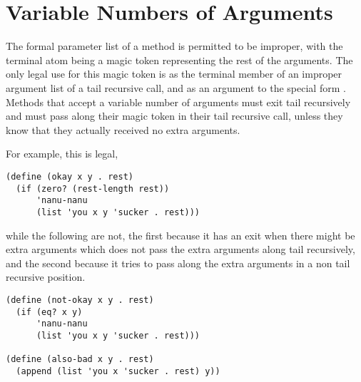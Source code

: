 



\section{Variable Numbers of Arguments} \label{sec:varargs}

The formal parameter list of a method is permitted to be improper,
with the terminal atom being a magic token representing the rest of
the arguments.  The only legal use for this magic token is as the
terminal member of an improper argument list of a tail recursive call,
and as an argument to the special form .  Methods that
accept a variable number of arguments must exit tail recursively and
must pass along their magic token in their tail recursive call, unless
they know that they actually received no extra arguments.


For example, this is legal,
\begin{verbatim}
(define (okay x y . rest)
  (if (zero? (rest-length rest))
      'nanu-nanu
      (list 'you x y 'sucker . rest)))
\end{verbatim}
while the following are not, the first because it has an exit when
there might be extra arguments which does not pass the extra arguments
along tail recursively, and the second because it tries to pass along
the extra arguments in a non tail recursive position.
\begin{verbatim}
(define (not-okay x y . rest)
  (if (eq? x y)
      'nanu-nanu
      (list 'you x y 'sucker . rest)))

(define (also-bad x y . rest)
  (append (list 'you x 'sucker . rest) y))
\end{verbatim}

